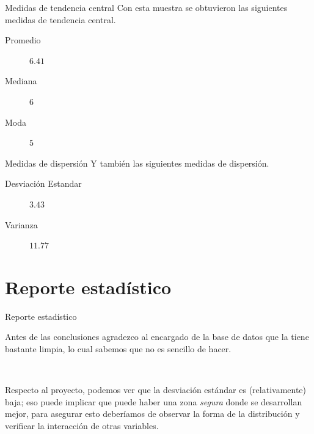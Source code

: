 \documentclass[11pt]{beamer}
\begin{document}
	\begin{frame}{Medidas de tendencia central}
		Con esta muestra se obtuvieron las siguientes medidas de tendencia central.
		\begin{description}
			\item [Promedio] $6.41$
			\item [Mediana] $6$
			\item [Moda] $5$
		\end{description}
	\end{frame}
	
	\begin{frame}{Medidas de dispersión}
		Y también las siguientes medidas de dispersión.
		\begin{description}
			\item [Desviación Estandar] $3.43$
			\item [Varianza] $11.77$
		\end{description}
	\end{frame}
	


\section{Reporte estadístico}
	\begin{frame}{Reporte estadístico}
		\par Antes de las conclusiones agradezco al encargado de la base de datos que la tiene bastante limpia, lo cual sabemos que no es sencillo de hacer.
		\par \
		\par Respecto al proyecto, podemos ver que la desviación estándar es (relativamente) baja; eso puede implicar que puede haber una zona \textit{segura} donde se desarrollan mejor, para asegurar esto deberíamos de observar la forma de la distribución y verificar la interacción de otras variables.
	\end{frame}



\newpage
\scriptsize
\end{document}
